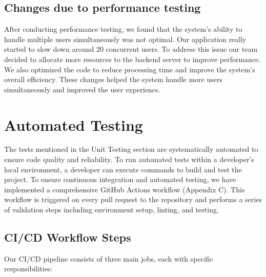 \documentclass[12pt, titlepage]{article}
\begin{document}
\subsection{Changes due to performance testing}
After conducting performance testing, we found that the system's ability to handle multiple users simultaneously was not optimal. Our application really started to slow down around 20 concurrent users. To address this issue our team decided to allocate more resources to the backend server to improve performance. We also optimized the code to reduce processing time and improve the system's overall efficiency. These changes helped the system handle more users simultaneously and improved the user experience.
\section{Automated Testing}

The tests mentioned in the Unit Testing section are systematically automated to ensure code quality and reliability. To run automated tests within a developer's local environment, a developer can execute commands to build and test the project.
\newline
To ensure continuous integration and automated testing, we have implemented a comprehensive GitHub Actions workflow (Appendix C). This workflow is triggered on every pull request to the repository and performs a series of validation steps including environment setup, linting, and testing.
\subsection{CI/CD Workflow Steps}

Our CI/CD pipeline consists of three main jobs, each with specific responsibilities:
\end{document}
